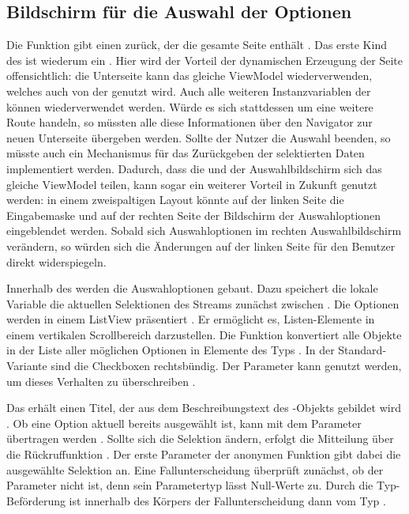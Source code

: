 \subsection{Bildschirm für die Auswahl der Optionen}

 
Die Funktion  \Lst{\ref{lst:Schritt1FunktionCreateMultipleChoiceSelectionScreen}} gibt einen  zurück, der die gesamte Seite enthält .
Das erste Kind des  ist wiederum ein  .
Hier wird der Vorteil der dynamischen Erzeugung der Seite offensichtlich: die Unterseite kann das gleiche ViewModel wiederverwenden, welches auch von der  genutzt wird.  Auch alle weiteren Instanzvariablen der  können wiederverwendet werden. Würde es sich stattdessen um eine weitere Route handeln, so müssten alle diese Informationen über den Navigator zur neuen Unterseite übergeben werden. Sollte der Nutzer die Auswahl beenden, so müsste auch ein Mechanismus für das Zurückgeben der selektierten Daten implementiert werden.
Dadurch, dass die  und der Auswahlbildschirm sich das gleiche ViewModel teilen, kann sogar ein weiterer Vorteil in Zukunft genutzt werden: in einem zweispaltigen Layout könnte auf der linken Seite die Eingabemaske und auf der rechten Seite der Bildschirm der Auswahloptionen eingeblendet werden.
Sobald sich Auswahloptionen im rechten Auswahlbildschirm verändern, so würden sich die Änderungen auf der linken Seite für den Benutzer direkt widerspiegeln.

Innerhalb des  werden die Auswahloptionen gebaut.
Dazu speichert die lokale Variable  die aktuellen Selektionen des Streams zunächst zwischen .
Die Optionen werden in einem ListView präsentiert .
Er ermöglicht es, Listen-Elemente in einem vertikalen Scrollbereich darzustellen.
Die Funktion  konvertiert alle Objekte in der Liste aller möglichen Optionen  in Elemente des Typs  .
In der Standard-Variante sind die Checkboxen rechtsbündig.
Der Parameter  kann genutzt werden, um dieses Verhalten zu überschreiben .

Das  erhält einen Titel, der aus dem Beschreibungstext  des -Objekts gebildet wird .
Ob eine Option aktuell bereits ausgewählt ist, kann mit dem Parameter  übertragen werden .
Sollte sich die Selektion ändern, erfolgt die Mitteilung über die Rückruffunktion  .
Der erste Parameter der anonymen Funktion gibt dabei die ausgewählte Selektion an.
Eine Fallunterscheidung überprüft zunächst, ob der Parameter  nicht  ist, denn sein Parametertyp  lässt Null-Werte zu.
Durch die Typ-Beförderung ist  innerhalb des Körpers der Fallunterscheidung dann vom Typ  . 


